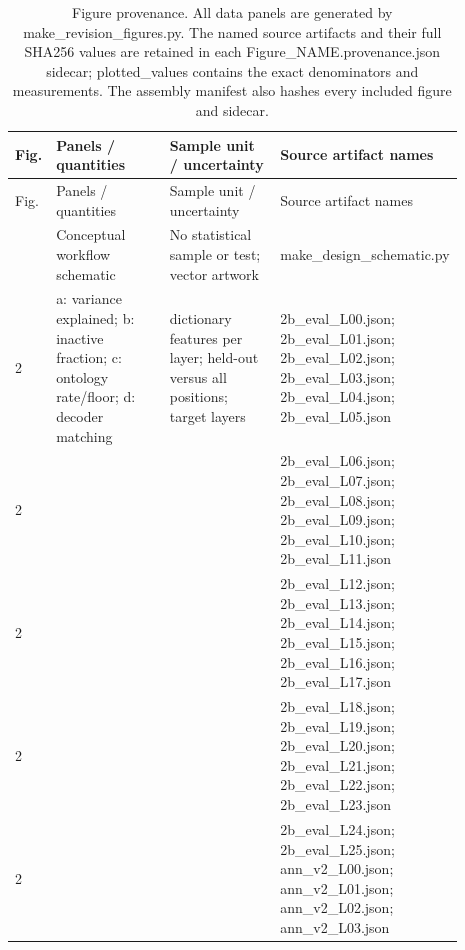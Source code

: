 \begin{longtable}{@{}L{0.05\linewidth}L{0.28\linewidth}L{0.26\linewidth}L{0.3\linewidth}@{}}
\caption{Figure provenance. All data panels are generated by make\_\allowbreak{}revision\_\allowbreak{}figures.py. The named source artifacts and their full SHA256 values are retained in each Figure\_\allowbreak{}NAME.provenance.json sidecar; plotted\_\allowbreak{}values contains the exact denominators and measurements. The assembly manifest also hashes every included figure and sidecar.}\\
\toprule
Fig. & Panels / quantities & Sample unit / uncertainty & Source artifact names \\
\midrule
\endfirsthead
\toprule
Fig. & Panels / quantities & Sample unit / uncertainty & Source artifact names \\
\midrule
\endhead
\endfoot
\bottomrule
{} & Conceptual workflow schematic & No statistical sample or test; vector artwork & make\_\allowbreak{}design\_\allowbreak{}schematic.py \\
2 & a: variance explained; b: inactive fraction; c: ontology rate/floor; d: decoder matching & dictionary features per layer; held-out versus all positions; target layers & 2b\_\allowbreak{}eval\_\allowbreak{}L00.json; 2b\_\allowbreak{}eval\_\allowbreak{}L01.json; 2b\_\allowbreak{}eval\_\allowbreak{}L02.json; 2b\_\allowbreak{}eval\_\allowbreak{}L03.json; 2b\_\allowbreak{}eval\_\allowbreak{}L04.json; 2b\_\allowbreak{}eval\_\allowbreak{}L05.json \\
2 &  &  & 2b\_\allowbreak{}eval\_\allowbreak{}L06.json; 2b\_\allowbreak{}eval\_\allowbreak{}L07.json; 2b\_\allowbreak{}eval\_\allowbreak{}L08.json; 2b\_\allowbreak{}eval\_\allowbreak{}L09.json; 2b\_\allowbreak{}eval\_\allowbreak{}L10.json; 2b\_\allowbreak{}eval\_\allowbreak{}L11.json \\
2 &  &  & 2b\_\allowbreak{}eval\_\allowbreak{}L12.json; 2b\_\allowbreak{}eval\_\allowbreak{}L13.json; 2b\_\allowbreak{}eval\_\allowbreak{}L14.json; 2b\_\allowbreak{}eval\_\allowbreak{}L15.json; 2b\_\allowbreak{}eval\_\allowbreak{}L16.json; 2b\_\allowbreak{}eval\_\allowbreak{}L17.json \\
2 &  &  & 2b\_\allowbreak{}eval\_\allowbreak{}L18.json; 2b\_\allowbreak{}eval\_\allowbreak{}L19.json; 2b\_\allowbreak{}eval\_\allowbreak{}L20.json; 2b\_\allowbreak{}eval\_\allowbreak{}L21.json; 2b\_\allowbreak{}eval\_\allowbreak{}L22.json; 2b\_\allowbreak{}eval\_\allowbreak{}L23.json \\
2 &  &  & 2b\_\allowbreak{}eval\_\allowbreak{}L24.json; 2b\_\allowbreak{}eval\_\allowbreak{}L25.json; ann\_\allowbreak{}v2\_\allowbreak{}L00.json; ann\_\allowbreak{}v2\_\allowbreak{}L01.json; ann\_\allowbreak{}v2\_\allowbreak{}L02.json; ann\_\allowbreak{}v2\_\allowbreak{}L03.json \\

\end{longtable}
